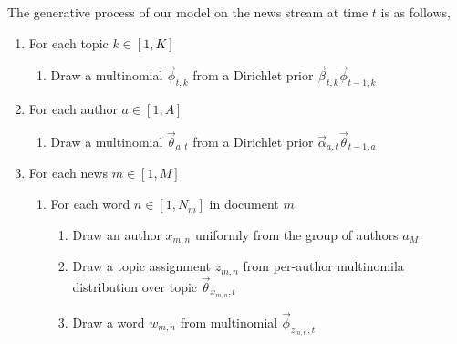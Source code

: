 The generative process of our model on the news stream at time $t$ is as follows,
\begin{enumerate}
   \item For each topic $k \in [1,K]$
   \begin{enumerate}
     \item Draw a multinomial $\vec{\phi}_{t,k}$ from a Dirichlet prior $\vec{\beta}_{t,k}\vec{\phi}_{t-1,k}$
    \end{enumerate}
   \item For each author $a \in [1,A]$
   \begin{enumerate}
     \item Draw a multinomial $\vec{\theta}_{a,t}$ from a Dirichlet prior $\vec{\alpha}_{a,t}\vec{\theta}_{t-1,a}$
    \end{enumerate}
    \item For each news $m \in [1,M]$
   \begin{enumerate}
     \item For each word $n \in [1,N_m]$ in document $m$
     \begin{enumerate}
            \item Draw an author $x_{m,n}$ uniformly from the group of authors $a_M$
            \item Draw a topic assignment $z_{m,n}$ from per-author multinomila distribution over topic $\vec{\theta}_{x_{m, n},t}$ %
            \item Draw a word $w_{m,n}$ from multinomial $\vec{\phi}_{z_{m, n},t}$
    \end{enumerate}
    \end{enumerate}
        
\end{enumerate}


